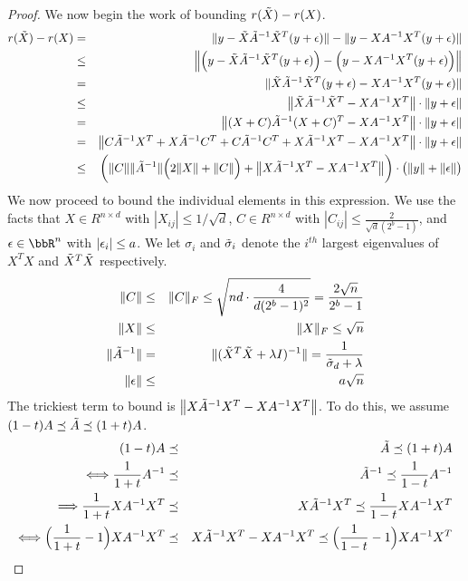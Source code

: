 \documentclass[12pt]{article}
\begin{document}
\begin{proof}
	\noindent We now begin the work of bounding $r(\tX) - r(X)$.
	\begin{eqnarray*}
		r(\tX) - r(X) &=& \|y-\tX\tA^{-1} \tX^T (y+\eps)\| - \|y-X A^{-1} X^T (y+\eps)\| \\
		&\leq& \Big\|\Big(y-\tX\tA^{-1} \tX^T (y+\eps)\Big) - \Big(y - X A^{-1} X^T (y+\eps)\Big)\Big\| \\
		&=& \|\tX\tA^{-1} \tX^T (y+\eps) - X A^{-1} X^T(y+\eps)\| \\
		&\leq& \big\|\tX\tA^{-1} \tX^T - X A^{-1} X^T\big\|\cdot \|y + \eps\| \\
		&=& \big\|(X+C)\tA^{-1} (X+C)^T - X A^{-1} X^T\big\|\cdot \|y + \eps\| \\
		&=& \big\|C \tA^{-1} X^T + X \tA^{-1} C^T + C \tA^{-1} C^T + X \tA^{-1} X^T - X A^{-1} X^T\big\|\cdot \|y + \eps\| \\
		&\leq& \bigg(\|C\| \|\tA^{-1}\|\Big(2\|X\| + \|C\|\Big) + \big\|X \tA^{-1} X^T - X A^{-1} X^T\big\|\bigg)\cdot \big(\|y\| + \|\eps\|\big) 
	\end{eqnarray*}
	We now proceed to bound the individual elements in this expression. We use the facts that $X \in R^{n \times d}$ with $|X_{ij}| \leq 1/\sqrt{d}$,
	$C \in R^{n \times d}$ with $|C_{ij}|\leq \frac{2}{\sqrt{d}(2^b-1)}$, and $\eps \in \RR^n$ with $|\eps_i| \leq a$.  We let $\sigma_i$ and $\tsigma_i$ denote the $i^{th}$ largest eigenvalues of $X^T X$ and $\tX^T \tX$ respectively.
	\begin{eqnarray*}
		\|C\| &\leq& \|C\|_F \leq \sqrt{nd \cdot \frac{4}{d(2^b-1)^2}} = \frac{2\sqrt{n}}{2^b-1} \\
		\|X\| &\leq& \|X\|_F \leq \sqrt{n}\\
		\|\tA^{-1}\| &=& \|(\tX^T\tX + \lambda I)^{-1}\|  = \frac{1}{\tsigma_d + \lambda} \\
		\|\eps\| &\leq& a\sqrt{n}
	\end{eqnarray*}
	The trickiest term to bound is $\big\|X \tA^{-1} X^T - X A^{-1} X^T\big\|$.  To do this, we assume $(1-t)A \preceq \tA \preceq (1+t)A$.
	\begin{eqnarray*}
		(1-t)A &\preceq& \tA \preceq (1+t)A\\
		\Longleftrightarrow \frac{1}{1+t}A^{-1} &\preceq& \tA^{-1} \preceq \frac{1}{1-t}A^{-1} \\
		\Longrightarrow \frac{1}{1+t} X A^{-1}X^T &\preceq& X \tA^{-1}X^T  \preceq \frac{1}{1-t}X A^{-1}X^T \\
		\Longleftrightarrow \Big(\frac{1}{1+t} - 1\Big)X A^{-1}X^T &\preceq& X \tA^{-1}X^T - XA^{-1}X^T \preceq \Big(\frac{1}{1-t}-1\Big)X A^{-1}X^T \\

\end{eqnarray*}
\end{proof}
\end{document}
